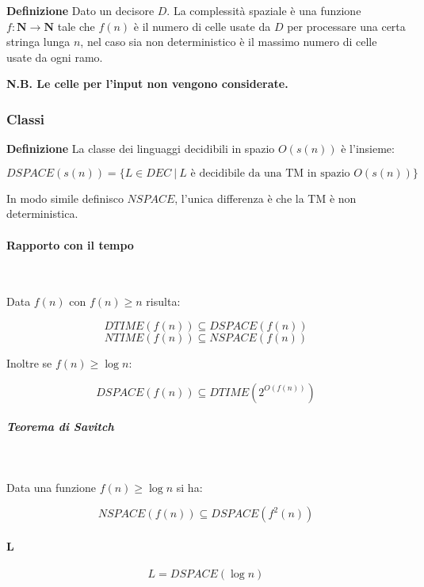 \documentclass{article}
\begin{document}
\textbf{Definizione} Dato un decisore $D$. La complessità spaziale è una funzione $f:\mathbf{N}\rightarrow\mathbf{N}$ tale che $f(n)$ è il numero di celle usate da $D$ per processare una certa stringa lunga $n$, nel caso sia non deterministico è il massimo numero di celle usate da ogni ramo.\newline

\noindent \textbf{N.B. Le celle per l'input non vengono considerate.}\newline

\subsubsection{Classi}

\noindent\textbf{Definizione} La classe dei linguaggi decidibili in spazio $O(s(n))$ è l'insieme:

$$DSPACE(s(n))=\{L\in DEC\ |\ L\text{ è decidibile da una TM in spazio }O(s(n))\}$$\newline

\noindent In modo simile definisco $NSPACE$, l'unica differenza è che la TM è non deterministica.

\paragraph{Rapporto con il tempo} $\ $\newline

\noindent Data $f(n)$ con $f(n)\geq n$ risulta:

$$DTIME(f(n))\subseteq DSPACE(f(n))$$
$$NTIME(f(n))\subseteq NSPACE(f(n))$$\newline

\noindent Inoltre se $f(n)\geq \log n$:

$$DSPACE(f(n))\subseteq DTIME(2^{O(f(n))})$$\newline 

\subparagraph{Teorema di Savitch} $\ $\newline

Data una funzione $f(n)\geq \log n$ si ha:

$$NSPACE(f(n))\subseteq DSPACE(f^2(n))$$\newline

\paragraph{L}

$$L=DSPACE(\log n)$$\newline
\end{document}

